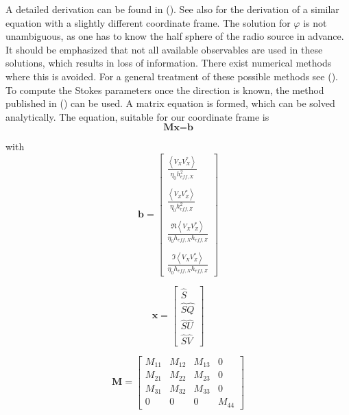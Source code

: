 \documentclass[galley,ras]{agu2001}
\begin{document}
\begin{article}
A detailed derivation can be found in (\cite{my_masterthesis}). See also \cite{cecconi05} for the derivation of a similar equation with a slightly different coordinate frame. The solution for $\varphi$ is not unambiguous, as one has to know the half sphere of the radio source in advance. It should be emphasized that not all available observables are used in these solutions, which results in loss of information. There exist numerical methods where this is avoided. For a general treatment of these possible methods see (\cite{my_masterthesis}). To compute the Stokes parameters once the direction is known, the method published in (\cite{cecconi05}) can be used. A matrix equation is formed, which can be solved analytically. The equation, suitable for our coordinate frame is\\

\begin{equation}\label{lineare_gleichung}
\textbf{M}\textbf{x}=\textbf{b}
\end{equation}

with\\

\begin{equation}
\textbf{b}=\left[ \begin{array}{c} \frac{\left\langle V_X V_X^{*} \right\rangle }{\eta_0 h_{eff,X}^2} \\
\\
\frac{\left\langle V_Z V_Z^{*} \right\rangle }{\eta_0 h_{eff,Z}^2}\\
\\
\frac{\Re \left\langle V_X V_Z^{*}\right\rangle }{\eta_0 h_{eff,X} h_{eff,Z}} \\
\\
\frac{\Im \left\langle V_X V_Z^{*}\right\rangle }{\eta_0 h_{eff,X} h_{eff,Z}}\end{array}
\right]
\end{equation}

\begin{equation} \textbf{x}=\left[ \begin{array}{c} \hat{S}\\ \hat{S}\hat{Q}\\
\hat{S}\hat{U}\\
\hat{S}\hat{V} \end{array}  \right]
\end{equation}


\begin{equation} \textbf{M}= \left[ \begin{array}{cccc} M_{11} & M_{12} & M_{13} & 0 \\
M_{21} &M_{22}  & M_{23} & 0 \\
M_{31}& M_{32} & M_{33} & 0 \\
0 & 0 & 0 &M_{44}
\end{array} \right]
\end{equation}


\end{article}
\end{document}
